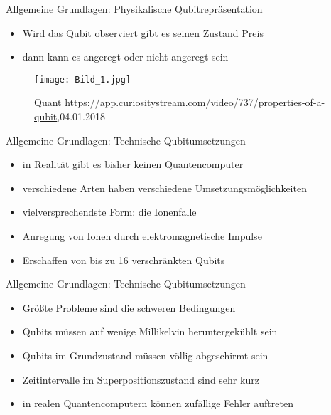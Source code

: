 \documentclass[]{beamer}
\begin{document}
\begin{frame}{Allgemeine Grundlagen: Physikalische Qubitrepräsentation}
\begin{center}
\begin{itemize}
  \item Wird das Qubit observiert gibt es seinen Zustand Preis
  \item dann kann es angeregt oder nicht angeregt sein
  \end{itemize}
  	\begin{figure}
  		\texttt{[image: Bild\_1.jpg]}
 	 	\caption{Quant \newline \footnotesize{\url{https://app.curiositystream.com/video/737/properties-of-a-qubit},04.01.2018}}
 	 	\centering
  	\end{figure}
\end{center}
\end{frame}


\begin{frame}{Allgemeine Grundlagen: Technische Qubitumsetzungen}
\begin{center}
\begin{itemize}
	\item in Realität gibt es bisher keinen Quantencomputer
    \item verschiedene Arten haben verschiedene Umsetzungsmöglichkeiten %
    \item vielversprechendste Form: die Ionenfalle
    \item Anregung von Ionen durch elektromagnetische Impulse
    \item Erschaffen von bis zu 16 verschränkten Qubits %
\end{itemize}
\end{center}
\end{frame}

\begin{frame}{Allgemeine Grundlagen: Technische Qubitumsetzungen}
\begin{center}
	\begin{itemize}
	\item Größte Probleme sind die schweren Bedingungen
    \item Qubits müssen auf wenige Millikelvin heruntergekühlt sein
    \item Qubits im Grundzustand müssen völlig abgeschirmt sein
    \item Zeitintervalle im Superpositionszustand sind sehr kurz
    \item in realen Quantencomputern können zufällige Fehler auftreten
\end{itemize}
\end{center}
\end{frame}
\end{document}
